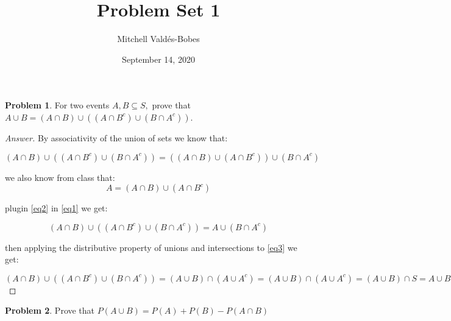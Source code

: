 \documentclass{article}
\title{Problem Set 1}
\author{Mitchell Valdés-Bobes}
\date{September 14, 2020}
\theoremstyle{definition}
\newtheorem{problem}{Problem}
\begin{document}
\maketitle

\begin{problem}
For two events $A, B \subseteq S,$ prove that $A \cup B=(A \cap B) \cup\left(\left(A \cap B^{c}\right) \cup\left(B \cap A^{c}\right)\right)$.

\end{problem}

\begin{proof}[Answer]

By associativity of the union of sets we know that:

\begin{equation}\label{eq1}
(A \cap B) \cup\left(\left(A \cap B^{c}\right) \cup\left(B \cap A^{c}\right)\right) = ((A \cap B) \cup \left(A \cap B^{c}\right)) \cup\left(B \cap A^{c}\right)    
\end{equation}

we also know from class that:
\begin{equation}\label{eq2}
A = (A\cap B) \cup (A\cap B^c)    
\end{equation}

plugin \eqref{eq2} in \eqref{eq1} we get:

\begin{equation}\label{eq3}
    (A \cap B) \cup\left(\left(A \cap B^{c}\right) \cup\left(B \cap A^{c}\right)\right) = A \cup\left(B \cap A^{c}\right)
\end{equation}

then applying the distributive property of unions and intersections to \eqref{eq3} we get:

$$(A \cap B) \cup\left(\left(A \cap B^{c}\right) \cup\left(B \cap A^{c}\right)\right) = (A \cup B) \cap( A \cup A^{c}) = (A\cup B) \cap (A\cup A^c)=(A\cup B) \cap S = A\cup B$$

\end{proof}

\begin{problem}
Prove that $P(A \cup B)=P(A)+P(B)-P(A \cap B)$

\end{problem}
\end{document}
